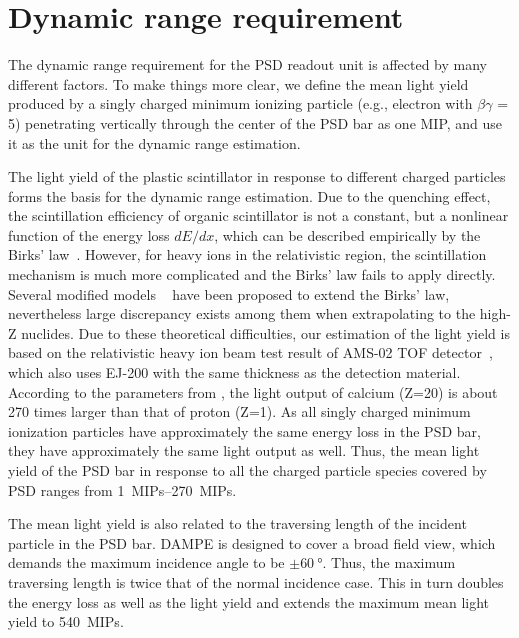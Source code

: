 \documentclass[preprint, times]{elsarticle}
\begin{document}
\section{Dynamic range requirement}
\label{sec:requirement}

The dynamic range requirement for the PSD readout unit is affected by many different factors.
To make things more clear, we define the mean light yield produced by a singly charged minimum ionizing particle (e.g., electron with $\beta\gamma$ = 5) penetrating vertically through the center of the PSD bar as one MIP, and use it as the unit for the dynamic range estimation.

The light yield of the plastic scintillator in response to different charged particles forms the basis for the dynamic range estimation.
Due to the quenching effect, the scintillation efficiency of organic scintillator is not a constant, but a nonlinear function of the energy loss $dE/dx$, which can be described empirically by the Birks' law~\cite{birks_theory_2013}.
 However, for heavy ions in the relativistic region, the scintillation mechanism is much more complicated and the Birks' law fails to apply directly. 
 Several modified models ~\cite{chou_nature_1952,tarle_cosmic_1979,menchaca-rocha_response_1999,matsufuji_response_1999} have been proposed to extend the Birks' law, nevertheless large discrepancy exists among them when extrapolating to the high-Z nuclides.
Due to these theoretical difficulties, our estimation of the light yield is based on the relativistic heavy ion beam test result of AMS-02 TOF detector~\cite{bindi2005performance,bindi_calibration_2014}, which also uses EJ-200 with the same thickness as the detection material.
According to the parameters from \cite{bindi2005performance}, the light output of calcium (Z=20) is about 270 times larger than that of proton (Z=1).
As all singly charged minimum ionization particles have approximately the same energy loss in the PSD bar, they have approximately the same light output as well.
Thus, the mean light yield of the PSD bar in response to all the charged particle species covered by PSD ranges from \SIrange{1}{270}{MIPs}.

The mean light yield is also related to the traversing length of the incident particle in the PSD bar.
DAMPE is designed to cover a broad field view, which demands the maximum incidence angle to be $\pm\SI{60}{\degree}$.
Thus, the maximum traversing length is twice that of the normal incidence case.
This in turn doubles the energy loss as well as the light yield and extends the maximum mean light yield to \SI{540}{MIPs}.
\end{document}
